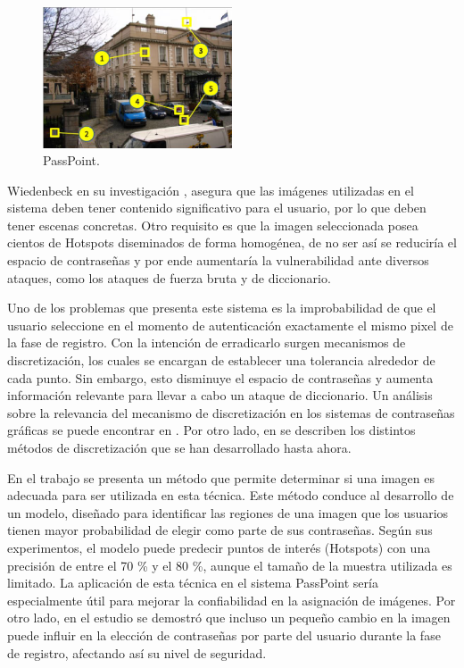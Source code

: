 \documentclass[12pt]{report}
\begin{document}
			\begin{figure}[ht]
		\centering
		\includegraphics[width=0.5\textwidth]{passpoint.png}
		\caption{PassPoint.}
		\label{fig:PassPoint}
	\end{figure}
	Wiedenbeck en su investigación \cite{1}, asegura que las imágenes utilizadas en el sistema deben tener contenido significativo para el usuario, por lo que deben tener escenas concretas. Otro requisito es que la imagen seleccionada posea cientos de Hotspots diseminados de forma homogénea, de no ser así se reduciría el espacio de contraseñas y por ende aumentaría la vulnerabilidad ante diversos ataques, como los ataques de fuerza bruta y de diccionario.
	 
	Uno de los problemas que presenta este sistema es la improbabilidad de que el usuario seleccione en el momento de autenticación exactamente el mismo pixel de la fase de registro. Con la intención de erradicarlo surgen mecanismos de discretización, los cuales se encargan de establecer una tolerancia alrededor de cada punto. Sin embargo, esto disminuye el espacio de contraseñas y aumenta información relevante para llevar a cabo un ataque de diccionario. Un análisis sobre la relevancia del mecanismo de discretización en los sistemas de contraseñas gráficas se puede encontrar en \cite{14,15,16}. Por otro lado, en \cite{14,15,16,17} se describen los distintos métodos de discretización que se han desarrollado hasta ahora.

	
	En el trabajo \cite{18} se presenta un método que permite determinar si una imagen es adecuada para ser utilizada en esta técnica. Este método conduce al desarrollo de un modelo, diseñado para identificar las regiones de una imagen que los usuarios tienen mayor probabilidad de elegir como parte de sus contraseñas. Según sus experimentos, el modelo puede predecir puntos de interés (Hotspots) con una precisión de entre el 70 \% y el 80 \%, aunque el tamaño de la muestra utilizada es limitado. La aplicación de esta técnica en el sistema PassPoint sería especialmente útil para mejorar la confiabilidad en la asignación de imágenes. Por otro lado, en el estudio \cite{19} se demostró que incluso un pequeño cambio en la imagen puede influir en la elección de contraseñas por parte del usuario durante la fase de registro, afectando así su nivel de seguridad.   
\end{document}
